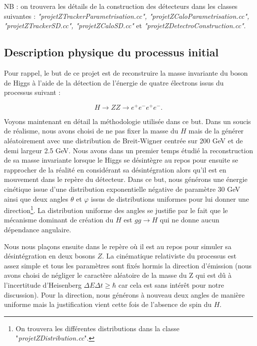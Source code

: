 \documentclass[11pt]{article}
\begin{document}
NB : on trouvera les détails de la construction des détecteurs dans les classes
suivantes : \textit{"projetZTrackerParametrisation.cc",
"projetZCaloParametrisation.cc", "projetZTrackerSD.cc", "projetZCaloSD.cc"} et 
\textit{"projetZDetectroConstruction.cc"}. 



\subsection{Description physique du processus initial}

Pour rappel, le but de ce projet est de reconstruire la masse invariante du
boson de Higgs à l'aide de la détection de l'énergie de quatre électrons issus
du processus suivant :

\begin{equation}
H \longrightarrow ZZ \longrightarrow e^+ e^- e^+ e^-.
\end{equation}

Voyons maintenant en détail la méthodologie utilisée dans ce but. Dans un
soucis de réalisme, nous avons choisi de ne pas fixer la masse du $H$ mais
de la générer aléatoirement avec une distribution de Breit-Wigner centrée sur
200 GeV et de demi largeur 2.5 GeV. Nous avons dans un premier temps étudié la reconstruction de sa masse
invariante lorsque le Higgs se désintègre au repos pour ensuite se rapprocher
de la réalité en considérant sa désintégration alors qu'il est en mouvement dans
le repère du détecteur. Dans ce but, nous générons une énergie cinétique issue
d'une distribution exponentielle négative de paramètre 30 GeV ainsi que deux
angles $\theta$ et $\varphi$ issus de distributions uniformes pour lui donner
une direction\footnote{On trouvera les différentes distributions dans la classe
"\textit{projetZDistribution.cc}".}. La distribution uniforme des angles se
justifie par le fait que le mécanisme dominant de création du $H$ est $ g g
\to H$ qui ne donne aucun dépendance angulaire. 

Nous nous plaçons
ensuite dans le repère où il est au repos pour simuler sa désintégration en deux
bosons $Z$. La cinématique relativiste du processus est assez simple et tous les
paramètres sont fixés hormis la direction d'émission (nous avons choisi de
négliger le caractère aléatoire de la masse du Z qui est dû à l'incertitude
d'Heisenberg $\Delta E \Delta t \geq \hbar$ car cela est sans intérêt pour notre
discussion). Pour la direction, nous générons à nouveau deux angles de manière
uniforme mais la justification vient cette fois de l'absence de spin du $H$. 
\end{document}
